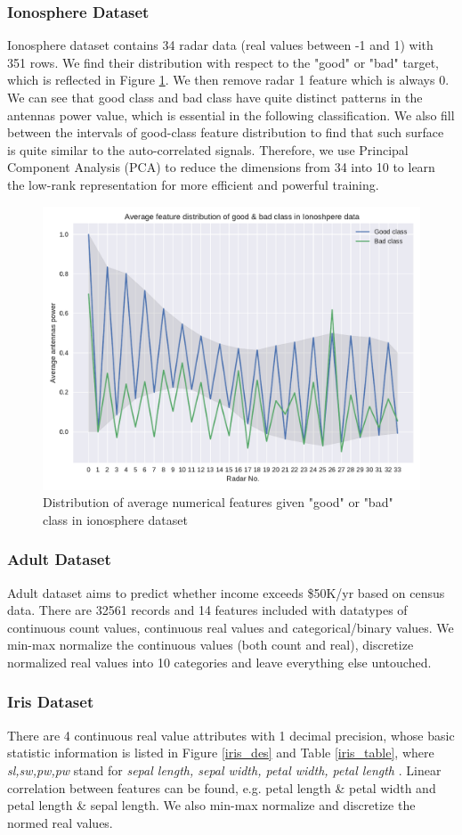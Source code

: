 \documentclass[11pt]{scrartcl}
\begin{document}
\subsubsection*{Ionosphere Dataset}
Ionosphere dataset contains 34 radar data (real values between -1 and 1) with 351 rows\cite{sigillito1989classification}. We find their distribution with respect to the "good" or "bad" target, which is reflected in Figure \ref{iono_feat}. We then remove radar 1 feature which is always 0. We can see that good class and bad class have quite distinct patterns in the antennas power value, which is essential in the following classification. We also fill between the intervals of good-class feature distribution to find that such surface is quite similar to the auto-correlated signals. Therefore, we use Principal Component Analysis (PCA) to reduce the dimensions from 34 into 10 to learn the low-rank representation for more efficient and powerful training.

\begin{figure}[t]
	\centering
	\includegraphics[width=0.6\linewidth]{fig/iono_feat_dist.pdf}
	\caption{Distribution of average numerical features given "good" or "bad" class in ionosphere dataset}
	\label{iono_feat}
\end{figure}

\subsubsection*{Adult Dataset}
Adult dataset aims to predict whether income exceeds \$50K/yr based on census data\cite{kohavi1996scaling}. There are 32561 records and 14 features included with datatypes of continuous count values, continuous real values and categorical/binary values. We min-max normalize the continuous values (both count and real),  discretize normalized real values into 10 categories and leave everything else untouched.


\subsubsection*{Iris Dataset}
There are 4 continuous real value attributes with 1 decimal precision, whose basic statistic information is listed in Figure \ref{iris_des} and Table \ref{iris_table}, where \textit{sl,sw,pw,pw} stand for \textit{sepal length, sepal width, petal width, petal length} \cite{fisher1936use}. Linear correlation between features can be found, e.g. petal length \& petal width and petal length \& sepal length. We also min-max normalize and discretize the normed real values.
\end{document}
